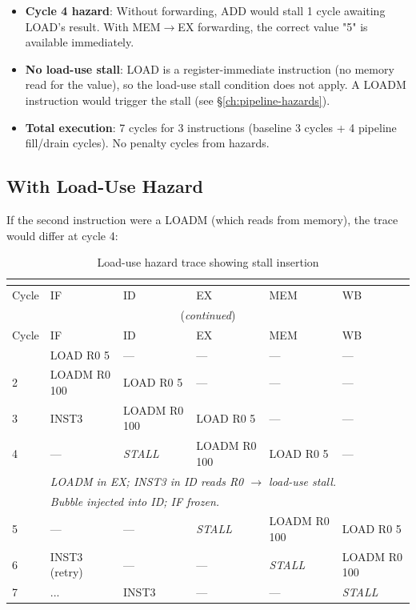 \documentclass[12pt,a4paper,twoside]{book}
\theoremstyle{trinarytheorem}
\theoremstyle{trinarydefinition}
\begin{document}
\begin{itemize}
    \item \textbf{Cycle 4 hazard}: Without forwarding, ADD would stall
          1 cycle awaiting LOAD's result. With MEM$\rightarrow$EX
          forwarding, the correct value "5" is available immediately.
    \item \textbf{No load-use stall}: LOAD is a register-immediate
          instruction (no memory read for the value), so the load-use
          stall condition does not apply. A LOADM instruction would
          trigger the stall (see \S\ref{ch:pipeline-hazards}).
    \item \textbf{Total execution}: 7 cycles for 3 instructions
          (baseline 3 cycles + 4 pipeline fill/drain cycles).
          No penalty cycles from hazards.
\end{itemize}

\subsection{With Load-Use Hazard}

If the second instruction were a LOADM (which reads from memory), the
trace would differ at cycle 4:

\begin{longtable}{l|l|l|l|l|l}
\caption{Load-use hazard trace showing stall insertion}
\label{tab:loadusetrace} \\
\multicolumn{6}{c}{} \\
\toprule
Cycle & IF & ID & EX & MEM & WB \\
\midrule
\endfirsthead
\multicolumn{6}{c}{(\emph{continued})} \\
\toprule
Cycle & IF & ID & EX & MEM & WB \\
\midrule
\endhead
\bottomrule
\endfoot
1   & LOAD R0 5  & --- & --- & --- & --- \\
2   & LOADM R0 100 & LOAD R0 5 & --- & --- & --- \\
3   & INST3    & LOADM R0 100 & LOAD R0 5 & --- & --- \\
4   & ---      & \emph{STALL} & LOADM R0 100 & LOAD R0 5 & --- \\
    & \multicolumn{5}{l}{\emph{LOADM in EX; INST3 in ID reads R0 $\rightarrow$ load-use stall.}} \\
    & \multicolumn{5}{l}{\emph{Bubble injected into ID; IF frozen.}} \\
5   & ---      & --- & \emph{STALL} & LOADM R0 100 & LOAD R0 5 \\
6   & INST3 (retry) & --- & --- & \emph{STALL} & LOADM R0 100 \\
7   & ...      & INST3 & --- & --- & \emph{STALL} \\
\bottomrule
\end{longtable}
\end{document}

